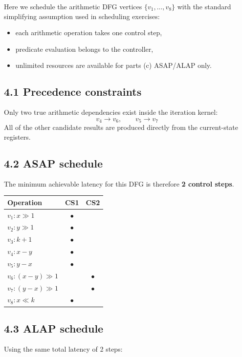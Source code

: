 \documentclass[11pt,a4paper]{article}
\begin{document}
Here we schedule the arithmetic DFG vertices $\{v_1,\ldots,v_8\}$ with the standard simplifying assumption used in scheduling exercises:
\begin{itemize}
  \item each arithmetic operation takes one control step,
  \item predicate evaluation belongs to the controller,
  \item unlimited resources are available for parts (c) ASAP/ALAP only.
\end{itemize}

\subsection*{4.1 Precedence constraints}
Only two true arithmetic dependencies exist inside the iteration kernel:
\[
v_4 \rightarrow v_6, \qquad v_5 \rightarrow v_7
\]
All of the other candidate results are produced directly from the current-state registers.

\subsection*{4.2 ASAP schedule}
The minimum achievable latency for this DFG is therefore \textbf{2 control steps}.

\begin{center}
\begin{tabular}{>{\raggedright\arraybackslash}p{2.3cm}cc}
\toprule
Operation & CS1 & CS2 \\
\midrule
$v_1: x \gg 1$ & $\bullet$ & \\
$v_2: y \gg 1$ & $\bullet$ & \\
$v_3: k+1$ & $\bullet$ & \\
$v_4: x-y$ & $\bullet$ & \\
$v_5: y-x$ & $\bullet$ & \\
$v_6: (x-y)\gg 1$ & & $\bullet$ \\
$v_7: (y-x)\gg 1$ & & $\bullet$ \\
$v_8: x \ll k$ & $\bullet$ & \\
\bottomrule
\end{tabular}
\end{center}

\subsection*{4.3 ALAP schedule}
Using the same total latency of 2 steps:
\end{document}
